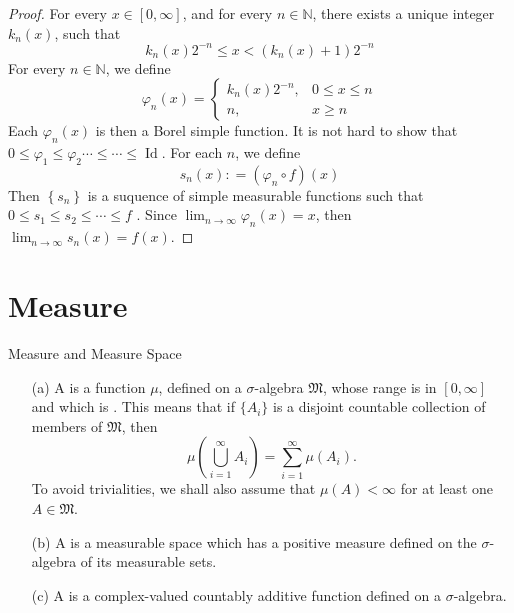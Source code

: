 \documentclass[../main.tex]{subfiles}
\begin{document}
\begin{proof}
    For every \(  x \in [0,\infty]  \), and for every \(  n\in \mathbb{N}   \), there exists a unique integer \(  k_{n}\left( x \right)   \), such that  \[
    k_{n}\left( x \right)2^{-n}\le x<  \left( k_{n}\left( x \right)+ 1  \right)2^{-n}  
    \]For every \(  n\in \mathbb{N}   \), we define
    \[
     \varphi _{n}\left( x \right)= \begin{cases}  k_{n}\left( x \right) 2^{-n},  &0\le x\le n\\ 
      n,& x\ge n\end{cases}  
    \]Each \(   \varphi _{n}\left( x \right)   \) is then a Borel simple function. It is not hard to show that \(  0\le  \varphi _1 \le  \varphi _2 \cdots \le \cdots  \le  \operatorname{Id}\). For each \(  n   \), we define \[
    s_{n}\left( x \right): = \left(  \varphi _{n}\circ f \right)\left( x \right)   
    \]   Then \( \left\{  s_{n}   \right\} \) is a suquence of simple measurable functions such that \(  0\le s_1\le s_2\le \cdots \le f  \) .  Since \(  \lim_{n\to \infty} \varphi _{n}\left( x \right)= x   \), then  \(  \lim_{n\to \infty}s_{n}\left( x \right)= f\left( x \right)    \).  
\end{proof}

\section{Measure}
\begin{definition}{Measure and Measure Space}{}
 \begin{enumerate}
    \item[(a)] A  is a function $\mu$, defined on a $\sigma$-algebra $\mathfrak{M}$, whose range is in $[0, \infty]$ and which is . This means that if $\{A_i\}$ is a disjoint countable collection of members of $\mathfrak{M}$, then
    \[ \mu\left(\bigcup_{i=1}^{\infty} A_{i}\right)=\sum_{i=1}^{\infty} \mu\left(A_{i}\right). \]
    To avoid trivialities, we shall also assume that $\mu(A) < \infty$ for at least one $A \in \mathfrak{M}$.
    \item[(b)] A  is a measurable space which has a positive measure defined on the $\sigma$-algebra of its measurable sets.
    \item[(c)] A  is a complex-valued countably additive function defined on a $\sigma$-algebra.
\end{enumerate}
\end{definition}
\end{document}
